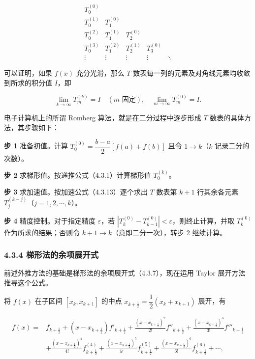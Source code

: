 \documentclass[
  10pt,
  fontset=fandol]{ctexart}
\begin{document}
\[
\begin{array}{ccccc}
T_0^{(0)}&&&&\\
T_0^{(1)}&T_1^{(0)}&&&\\
T_0^{(2)}&T_1^{(1)}&T_2^{(0)}&&\\
T_0^{(3)}&T_1^{(2)}&T_2^{(1)}&T_3^{(0)}&\\
\vdots&\vdots&\vdots&\vdots&\ddots
\end{array}
\]

可以证明，如果 \(f(x)\) 充分光滑，那么 \(T\) 数表每一列的元素及对角线元素均收敛到所求的积分值 \(I\)，即

\[
\lim_{k\to\infty}T_m^{(k)}=I\quad(m\text{ 固定}),\quad\lim_{m\to\infty}T_m^{(0)}=I.
\]

电子计算机上的所谓 Romberg 算法，就是在二分过程中逐步形成 \(T\) 数表的具体方法，其步骤如下：

\textbf{步 1} 准备初值。计算 \(T_0^{(0)}=\dfrac{b-a}{2}[f(a)+f(b)]\) 且令 \(1\to k\)（\(k\) 记录二分的次数）。

\textbf{步 2} 求梯形值。按递推公式（4.3.1）计算梯形值 \(T_0^{(k)}\)。

\textbf{步 3} 求加速值。按加速公式（4.3.13）逐个求出 \(T\) 数表第 \(k+1\) 行其余各元素 \(T_j^{(k-j)}\)（\(j=1,2,\cdots,k\)）。

\textbf{步 4} 精度控制。对于指定精度 \(\varepsilon\)，若 \(|T_k^{(0)}-T_{k-1}^{(0)}|<\varepsilon\)，则终止计算，并取 \(T_k^{(0)}\) 作为所求的结果；否则令 \(k+1\to k\)（意即二分一次），转步 2 继续计算。

\subsubsection{4.3.4 梯形法的余项展开式}\label{ux68afux5f62ux6cd5ux7684ux4f59ux9879ux5c55ux5f00ux5f0f}

前述外推方法的基础是梯形法的余项展开式（4.3.7），现在运用 Taylor 展开方法推导这个公式。

将 \(f(x)\) 在子区间 \([x_k,x_{k+1}]\) 的中点 \(x_{k+\frac12}=\dfrac12(x_k+x_{k+1})\) 展开，有

\[
\begin{aligned}
f(x)={}&f_{k+\frac12}+(x-x_{k+\frac12})f'_{k+\frac12}
+\frac{(x-x_{k+\frac12})^2}{2!}f''_{k+\frac12}
+\frac{(x-x_{k+\frac12})^3}{3!}f'''_{k+\frac12}\\
&+\frac{(x-x_{k+\frac12})^4}{4!}f^{(4)}_{k+\frac12}
+\frac{(x-x_{k+\frac12})^5}{5!}f^{(5)}_{k+\frac12}
+\frac{(x-x_{k+\frac12})^6}{6!}f^{(6)}_{k+\frac12}+\cdots,
\end{aligned}
\tag{4.3.14}
\]
\end{document}
